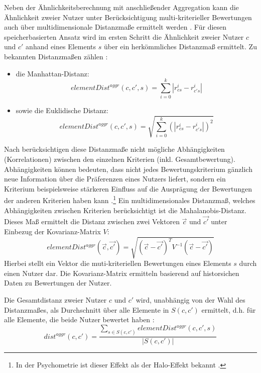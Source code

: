 Neben der Ähnlichkeitsberechnung mit anschließender Aggregation kann die Ähnlichkeit zweier Nutzer unter Berücksichtigung multi-kriterieller Bewertungen auch über multidimensionale Distanzmaße ermittelt werden \cite[S. 857]{adomavicius:4:inbook}.
Für diesen speicherbasierten Ansatz wird im ersten Schritt die Ähnlichkeit zweier Nutzer $c$ und $c'$ anhand eines Elements $s$ über ein herkömmliches Distanzmaß ermittelt.
Zu bekannten Distanzmaßen zählen \textcite[S. 857f.]{adomavicius:4:inbook}:
\begin{itemize}
    \item die Manhattan-Distanz:
    \begin{equation}\label{eq18}
        elementDist^{aggr}(c,c',s)= \sum\limits_{i=0}^{k}|r_{cs}^{i}-r_{c's}^{i}|
    \end{equation}
    \item sowie die Euklidische Distanz:
    \begin{equation}\label{eq19}
        elementDist^{aggr}(c,c',s)= \sqrt{\sum\limits_{i=0}^{k}(|r_{cs}^{i}-r_{c's}^{i}|)^{2}}
    \end{equation}
\end{itemize}

Nach \textcite[S. 240]{sahoo:article} berücksichtigen diese Distanzmaße nicht mögliche Abhängigkeiten (Korrelationen) zwischen den einzelnen Kriterien (inkl. Gesamtbewertung).
Abhängigkeiten können bedeuten, dass nicht jedes Bewertungskriterium gänzlich neue Information über die Präferenzen eines Nutzers liefert, sondern ein Kriterium beispielsweise stärkeren Einfluss auf die Ausprägung der Bewertungen der anderen Kriterien haben kann \cite[S. 235]{sahoo:article}.\footnote{In der Psychometrie ist dieser Effekt als der Halo-Effekt bekannt \cite[S. 3]{sahoo:2:article}.}
Ein multidimensionales Distanzmaß, welches Abhängigkeiten zwischen Kriterien berücksichtigt ist die Mahalanobis-Distanz.
Dieses Maß ermittelt die Distanz zwischen zwei Vektoren $\vec{c}$ und $\vec{c'}$ unter Einbezug der Kovarianz-Matrix $V$:
\begin{equation}\label{eq25}
    elementDist^{aggr}(\vec{c},\vec{c'}) = \sqrt{(\vec{c}-\vec{c'})^{T}V^{-1}(\vec{c}-\vec{c'})}
\end{equation}
Hierbei stellt ein Vektor die muti-kriteriellen Bewertungen eines Elements $s$ durch einen Nutzer dar.
Die Kovarianz-Matrix ermitteln \textcite[S. 240]{sahoo:article} basierend auf historsichen Daten zu Bewertungen der Nutzer.

Die Gesamtdistanz zweier Nutzer $c$ und $c'$ wird, unabhängig von der Wahl des Distanzmaßes, als Durchschnitt über alle Elemente in $S(c,c')$ ermittelt, d.h. für alle Elemente, die beide Nutzer bewertet haben \cite[S. 858]{adomavicius:4:inbook}:
\begin{equation}\label{eq20}
    dist^{aggr}(c,c')= \frac{\sum\limits_{s \in S(c,c')}elementDist^{aggr}(c,c',s)}{|S(c,c')|}
\end{equation}


